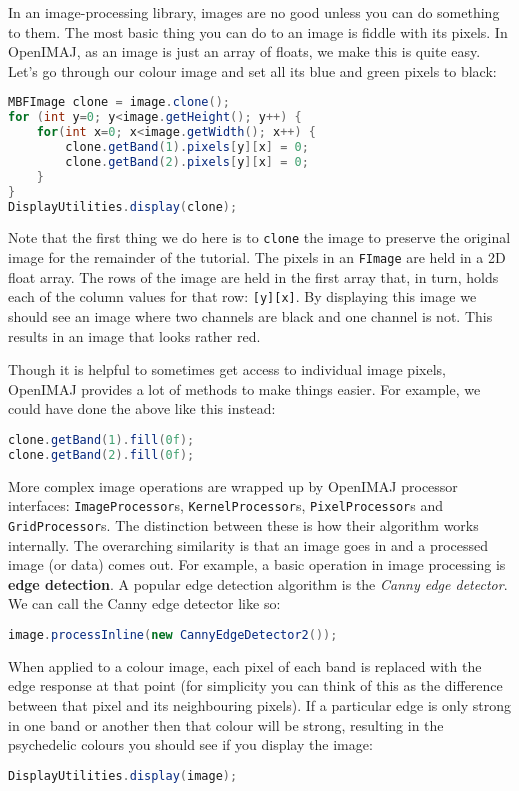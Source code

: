 In an image-processing library, images are no good unless you can do something to them. The most basic 
thing you can do to an image is fiddle with its pixels. In OpenIMAJ, as an image is just an array of 
floats, we make this is quite easy. Let's go through our colour image and set all its blue and green 
pixels to black: 
\begin{lstlisting}[language=java]
MBFImage clone = image.clone();
for (int y=0; y<image.getHeight(); y++) {
    for(int x=0; x<image.getWidth(); x++) {
        clone.getBand(1).pixels[y][x] = 0;
        clone.getBand(2).pixels[y][x] = 0;
    }
}
DisplayUtilities.display(clone);
\end{lstlisting}
Note that the first thing we do here is to \verb+clone+ the image to preserve the original image
for the remainder of the tutorial. The pixels in an \verb+FImage+ are held in a 2D float array. The rows 
of the image are held in the first array that, in turn, holds each of the column values for that 
row:  \verb+[y][x]+. By displaying this image we should see an image where two channels are black 
and one channel is not. This results in an image that looks rather red. 

Though it is helpful to sometimes get access to individual image pixels, OpenIMAJ provides a lot 
of methods to make things easier. For example, we could have done the above like this instead:
\begin{lstlisting}[language=java]
clone.getBand(1).fill(0f);
clone.getBand(2).fill(0f);
\end{lstlisting}

More complex image operations are wrapped up by OpenIMAJ processor interfaces: \verb+ImageProcessor+s, \verb+KernelProcessor+s,
\verb+PixelProcessor+s and \verb+GridProcessor+s. The distinction between these is how their algorithm works internally. The overarching similarity is that an image goes 
in and a processed image (or data) comes out. For example, a basic operation in image processing 
is \textbf{edge detection}. A popular edge detection algorithm is the \emph{Canny edge detector}. 
We can call the Canny edge detector like so:
\begin{lstlisting}[language=java]
image.processInline(new CannyEdgeDetector2());
\end{lstlisting}
When applied to a colour image, each pixel of each band is replaced with the edge response at 
that point (for simplicity you can think of this as the difference between that pixel and its 
neighbouring pixels). If a particular edge is only strong in one band or another then that 
colour will be strong, resulting in the psychedelic colours you should see if you display 
the image:
\begin{lstlisting}[language=java]
DisplayUtilities.display(image);
\end{lstlisting}

